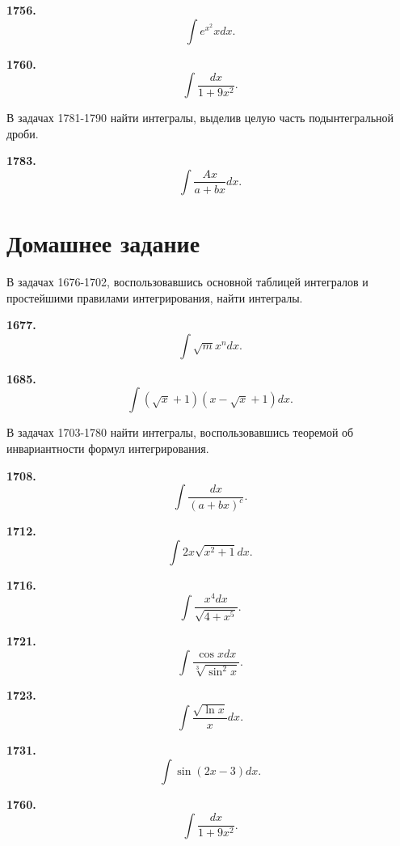 \documentclass[a4paper,10pt]{article}
\newcommand{\exercize}[1]{\textbf{#1.}}
\begin{document}
\exercize{1756} \[ \int{e^{x^2} x dx.} \]

\exercize{1760} \[ \int{\frac{dx}{1 + 9 x^2}.} \]


В задачах 1781-1790 найти интегралы, выделив целую часть подынтегральной дроби.

\exercize{1783} \[ \int{\frac{A x}{a + b x} dx.} \]


\section{Домашнее задание}

В задачах 1676-1702, воспользовавшись основной таблицей интегралов и простейшими правилами интегрирования, найти интегралы.

\exercize{1677} \[ \int{\sqrt{m}{x^n}dx.} \]

\exercize{1685} \[ \int{(\sqrt{x} + 1)(x - \sqrt{x} + 1) dx.} \]

В задачах 1703-1780 найти интегралы, воспользовавшись теоремой об инвариантности формул интегрирования.

\exercize{1708} \[ \int{\frac{dx}{(a + bx)^c}.} \]

\exercize{1712} \[ \int{2 x \sqrt{x^2 + 1} dx.} \]

\exercize{1716} \[ \int{\frac{x^4 dx}{\sqrt{4 + x^5}}.} \]

\exercize{1721} \[ \int{\frac{\cos{x} dx}{\sqrt[3]{\sin^2{x}}}.} \]

\exercize{1723} \[ \int{\frac{\sqrt{\ln{x}}}{x} dx.} \]

\exercize{1731} \[ \int{\sin{(2x - 3)}dx.} \]

\exercize{1760} \[ \int{\frac{dx}{1 + 9 x^2}.} \]
\end{document}
